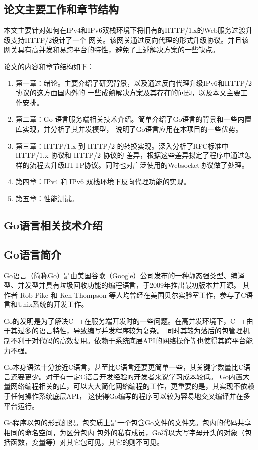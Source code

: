 \documentclass[twoside]{CUGThesis}
\begin{document}
	\subsection{论文主要工作和章节结构}
	本文主要针对如何在IPv4和IPv6双栈环境下将旧有的HTTP/1.x的Web服务过渡升级支持HTTP/2设计了一个
	网关。该网关通过反向代理的形式升级协议。并且该网关具有高并发和易跨平台的特性，避免了上述解决方案的一些缺点。\par 
	论文的内容和章节结构如下：
	\begin{enumerate}
		\item 第一章：绪论。主要介绍了研究背景，以及通过反向代理升级IPv6和HTTP/2协议的这方面国内外的
		一些成熟解决方案及其存在的问题，以及本文主要工作安排。
		\item 第二章：Go 语言服务端相关技术介绍。简单介绍了Go语言的背景和一些内置库实现，并分析了其并发模型，
		说明了Go语言应用在本项目的一些优势。
		\item 第三章：HTTP/1.x 到 HTTP/2 的转换实现。深入分析了RFC标准中 HTTP/1.x 协议和 HTTP/2 协议的
		差异，根据这些差异拟定了程序中通过怎样的流程去升级HTTP协议。同时也对广泛使用的Websocket协议做了处理。
		\item 第四章：IPv4 和 IPv6 双栈环境下反向代理功能的实现。
		\item 第五章：性能测试。
	\end{enumerate}
	
	\begin{spacing}{2}
		\section{Go语言相关技术介绍}
	\end{spacing}
	\subsection{Go语言简介}
	Go语言（简称Go）是由美国谷歌（Google）公司发布的一种静态强类型、编译型、并发型并具有垃圾回收功能的编程语言，于2009年推出最初版本并开源。
	其作者 Rob Pike 和 Ken Thompson 等人均曾经在美国贝尔实验室工作，参与了C语言和Unix系统的开发工作。\par 
	Go的发明是为了解决C++在服务端开发时的一些问题。在高并发环境下，C++由于其过多的语言特性，导致编写并发程序较为复杂。
	同时其较为落后的包管理机制不利于对代码的高效复用。依赖于系统底层API的网络操作等也使得其跨平台能力不强。\par
	Go本身语法十分接近C语言，甚至比C语言还要更简单一些，其关键字数量比C语言还要更少。对于有一定C语言开发经验的开发者来说学习成本较低。
	Go内置大量网络编程相关的库，可以大大简化网络编程的工作，更重要的是，其实现不依赖于任何操作系统底层API，
	这使得Go编写的程序可以较为容易地交叉编译并在多平台运行。\par
	Go程序以包的形式组织。包实质上是一个包含Go文件的文件夹。包内的代码共享相同的命名空间，为区分包内
	包外的私有成员，Go将以大写字母开头的对象（包括函数，变量等）对其它包可见，其它的则不可见。\par 
\end{document}
